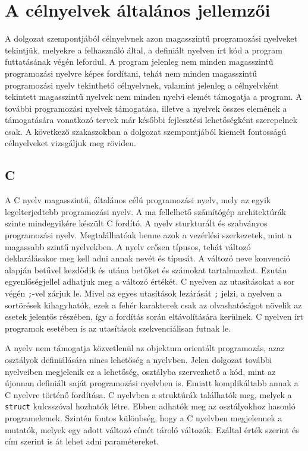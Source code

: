 
\section{A célnyelvek általános jellemzői}

A dolgozat szempontjából célnyelvnek azon magasszintű programozási nyelveket tekintjük, melyekre a felhasználó által, a definiált nyelven írt kód a program futtatásának végén lefordul. A program jelenleg nem minden magasszintű programozási nyelvre képes fordítani, tehát nem minden magasszintű programozási nyelv tekinthető célnyelvnek, valamint jelenleg a célnyelvként tekintett magasszintű nyelvek nem minden nyelvi elemét támogatja a program.
A további programozási nyelvek támogatása, illetve a nyelvek összes elemének a támogatására vonatkozó tervek már későbbi fejlesztési lehetőségként szerepelnek csak.
A következő szakaszokban a dolgozat szempontjából kiemelt fontosságú célnyelveket vizsgáljuk meg röviden.

\subsection{C}

A C nyelv magasszintű, általános célú programozási nyelv, mely az egyik legelterjedtebb programozási nyelv.
A ma fellelhető számítógép architektúrák szinte mindegyikére készült C fordító.
A nyelv sturkturált és szabványos programozási nyelv.
Megtalálhatóak benne azok a vezérlési szerkezetek, mint a magassabb szintű nyelvekben.
A nyelv erősen típusos, tehát változó deklarálásakor meg kell adni annak nevét és típusát.
A változó neve konvenció alapján betűvel kezdődik és utána betűket és számokat tartalmazhat.
Ezután egyenlőségjellel adhatjuk meg a változó értékét.
C nyelven az utasításokat a sor végén \texttt{;}-vel zárjuk le.
Mivel az egyes utasítások lezárását \texttt{;} jelzi, a nyelven a sortörések kihagyhatók, ezek a fehér karakterek csak az olvashatóságot növelik az esetek jelentős részében, így a fordítás során eltávolítására kerülnek.
C nyelven írt programok esetében is az utasítások szekvenciálisan futnak le.

A nyelv nem támogatja közvetlenül az objektum orientált programozás, azaz osztályok definiálására nincs lehetőség a nyelvben.
Jelen dolgozat további nyelveiben megjelenik ez a lehetőség, osztályba szervezhető a kód, mint az újonnan definiált saját programozási nyelvben is.
Emiatt komplikáltabb annak a C nyelvre történő fordítása.
C nyelvben a struktúrák találhatók meg, melyek a \texttt{struct} kulcsszóval hozhatók létre.
Ebben adhatók meg az osztályokhoz hasonló programelemek. Szintén fontos különbség, hogy a C nyelvben megjelennek a mutatók, melyek egy adott változó címét tároló változók. Ezáltal érték szerint és cím szerint is át lehet adni paramétereket.

